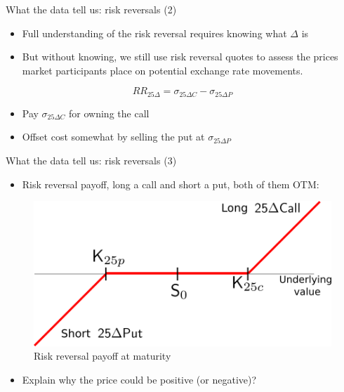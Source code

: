 \begin{frame}{What the data tell us: risk reversals (2)}

\begin{itemize}
\tightlist
\item
  Full understanding of the risk reversal requires knowing what
  \(\Delta\) is
\item
  But without knowing, we still use risk reversal quotes to assess the
  prices market participants place on potential exchange rate movements.
\end{itemize}

\[
RR_{25\Delta} = \sigma_{25\Delta C} - \sigma_{25\Delta P}
\]

\begin{itemize}
\tightlist
\item
  Pay \(\sigma_{25\Delta C}\) for owning the call
\item
  Offset cost somewhat by selling the put at \(\sigma_{25\Delta P}\)
\end{itemize}

\end{frame}

\begin{frame}{What the data tell us: risk reversals (3)}

\begin{itemize}
\tightlist
\item
  Risk reversal payoff, long a call and short a put, both of them OTM:
\end{itemize}

\begin{figure}
\includegraphics[width=0.7\linewidth]{images/fig25RRSimple} \caption{Risk reversal payoff at maturity}\label{fig:unnamed-chunk-13}
\end{figure}

\begin{itemize}
\tightlist
\item
  Explain why the price could be positive (or negative)?
\end{itemize}

\end{frame}

